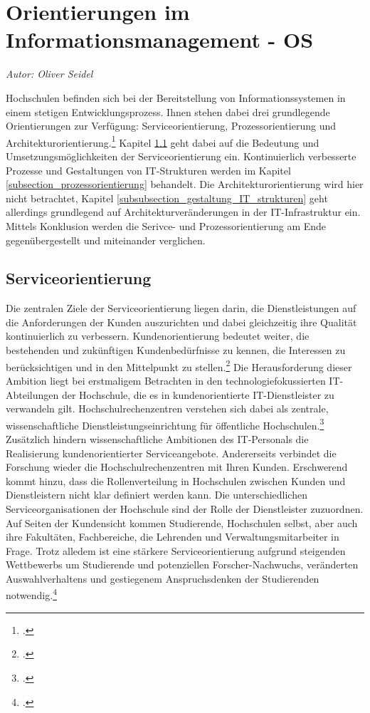 \section{Orientierungen im Informationsmanagement - OS}
\textit{Autor: Oliver Seidel}

Hochschulen befinden sich bei der Bereitstellung von Informationssystemen in einem stetigen Entwicklungsprozess. Ihnen stehen dabei drei grundlegende Orientierungen zur Verfügung: 
Serviceorientierung, Prozessorientierung und 
Architekturorientierung.\footcite[Vgl.][32]{leitner_itil_2008} Kapitel 
\ref{subsection_serviceorientierung} geht dabei auf die Bedeutung und 
Umsetzungsmöglichkeiten der Serviceorientierung ein. Kontinuierlich verbesserte Prozesse 
und Gestaltungen von IT-Strukturen werden im Kapitel \ref{subsection_prozessorientierung} 
behandelt. Die Architekturorientierung wird hier nicht betrachtet, Kapitel 
\ref{subsubsection_gestaltung_IT_strukturen} geht allerdings grundlegend auf 
Architekturveränderungen in der IT-Infrastruktur ein. Mittels Konklusion werden die Serivce- und Prozessorientierung am Ende gegenübergestellt und miteinander verglichen.


\subsection{Serviceorientierung}
\label{subsection_serviceorientierung}
Die zentralen Ziele der Serviceorientierung liegen darin, die Dienstleistungen auf die 
Anforderungen der Kunden auszurichten und dabei gleichzeitig ihre Qualität kontinuierlich 
zu verbessern. Kundenorientierung bedeutet weiter, die bestehenden und zukünftigen 
Kundenbedürfnisse zu kennen, die Interessen zu berücksichtigen und in den Mittelpunkt zu 
stellen.\footcite[Vgl.][34]{leitner_itil_2008} Die Herausforderung dieser Ambition liegt bei 
erstmaligem Betrachten in den technologiefokussierten IT-Abteilungen der Hochschule, die 
es in kundenorientierte IT-Dienstleister zu verwandeln gilt. Hochschulrechenzentren 
verstehen sich dabei als zentrale, wissenschaftliche Dienstleistungseinrichtung für 
öffentliche Hochschulen.\footcite[Vgl.][10]{schroeder_2011} Zusätzlich hindern 
wissenschaftliche Ambitionen des IT-Personals die Realisierung kundenorientierter 
Serviceangebote. Andererseits verbindet die Forschung wieder die Hochschulrechenzentren 
mit Ihren Kunden. Erschwerend kommt hinzu, dass die Rollenverteilung in Hochschulen 
zwischen Kunden und Dienstleistern nicht klar definiert werden kann. Die unterschiedlichen 
Serviceorganisationen der Hochschule sind der Rolle der Dienstleister zuzuordnen. Auf 
Seiten der Kundensicht kommen Studierende, Hochschulen selbst, aber auch ihre Fakultäten, 
Fachbereiche, die Lehrenden und Verwaltungsmitarbeiter in Frage. Trotz alledem ist eine 
stärkere Serviceorientierung aufgrund steigenden Wettbewerbs um Studierende und 
potenziellen Forscher-Nachwuchs, veränderten Auswahlverhaltens und gestiegenem 
Anspruchsdenken der Studierenden notwendig.\footcite[Vgl.][14]{leitner_itil_2008}

